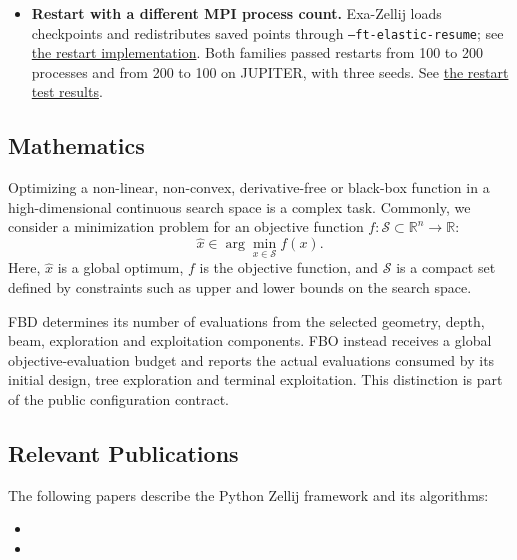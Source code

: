\begin{itemize}
\item \textbf{Restart with a different MPI process count.} Exa-Zellij
loads checkpoints and redistributes saved points through
\texttt{--ft-elastic-resume}; see \href{https://github.com/MehdielKhadiri/Exa-Zellij/blob/eddc639b034b0ca26f145c407f398e908e5b4498/src/main.cpp\#L3776-L4028}{the restart implementation}.
Both families passed restarts from 100 to 200 processes and from 200 to 100
on JUPITER, with three seeds. See \href{https://github.com/MehdielKhadiri/Exa-Zellij/blob/eddc639b034b0ca26f145c407f398e908e5b4498/docs/validation/jupiter-restart.md}{the restart test results}.
\end{itemize}

\subsection{Mathematics}
\label{sec:Zellij:mathematics}

Optimizing a non-linear, non-convex, derivative-free or black-box
function in a high-dimensional continuous search space is a complex
task. Commonly, we consider a minimization problem for an objective
function ${f: \mathcal{S} \subset \mathbb{R}^n \rightarrow \mathbb{R}}$:
\begin{equation}
\label{eq:minproblem}
   \hat{x} \in \arg\min_{x \in \mathcal{S}} f(x).
\end{equation}
Here, $\hat{x}$ is a global optimum, $f$ is the objective function, and
$\mathcal{S}$ is a compact set defined by constraints such as upper and
lower bounds on the search space.

FBD determines its number of evaluations from the selected geometry,
depth, beam, exploration and exploitation components. FBO instead receives a
global objective-evaluation budget and reports the actual evaluations
consumed
by its initial design, tree exploration and terminal exploitation. This
distinction is part of the public configuration contract.

\subsection{Relevant Publications}
\label{sec:Zellij:publications}

The following papers describe the Python Zellij framework and its algorithms:

\begin{itemize}
     \item {}
     \item {}
\end{itemize}


